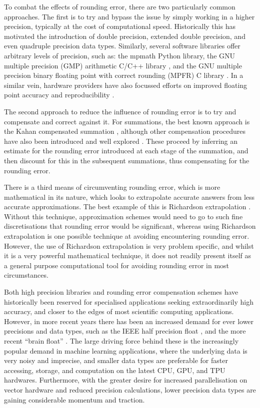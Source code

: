 \documentclass[manuscript,review]{acmart}
\begin{document}
To combat the effects of rounding error, there are two particularly common approaches. The first is to try and bypass the issue by simply working in a higher precision, typically at the cost of computational speed. Historically this has motivated the introduction of double precision, extended double precision, and even quadruple precision data types. Similarly, several software libraries offer arbitrary levels of precision, such as: the mpmath \citep{mpmath} Python library, the GNU
multiple precision (GMP) arithmetic C/C++ library \citep{granlund2012gmp}, and the GNU multiple precision binary floating point with correct rounding (MPFR) C library \citep{fousse2007MPFR}. In a similar vein, hardware providers have also focussed efforts on improved floating point accuracy and reproducibility  \citep{burgess2018high}.

The second approach to reduce the influence of rounding error is to try and compensate and correct against it. For summations, the best known approach is the Kahan compensated summation \citep{kahan1965further}, although other compensation procedures have also been introduced and well explored \citep{moller1965quasi,knuth2014art,dekker1971floating,neumaier1974rounding,babuska1968numerical,klein2006generalised,linz1970floating,ogita2005accurate}. These proceed by inferring an estimate for the rounding error introduced at each stage of the summation, and then discount for this in the subsequent summations, thus compensating for the rounding error. 

There is a third means of circumventing rounding error, which is more mathematical in its nature, which looks to extrapolate accurate answers from less accurate approximations. The best example of this is Richardson extrapolation \citep{richardson1927viii,marchuk2012difference}. Without this technique, approximation schemes would need to go to such fine discretisations that rounding error would be significant, whereas using Richardson extrapolation is one possible technique at avoiding encountering rounding error. However, the use of Richardson extrapolation is very problem specific, and whilst it is a very powerful mathematical technique, it does not readily present itself as a general purpose computational tool for avoiding rounding error in most circumstances.  

Both high precision libraries and rounding error compensation schemes have historically been reserved for specialised applications seeking extraordinarily high accuracy, and closer to the edges of most scientific computing applications. However, in more recent years there has been an increased demand for ever lower precisions and data types, such as the IEEE half precision float \citep{ieee2008ieee}, and the more recent ``brain float'' \citep{burgess2019bfloat16,kalamkar2019study}. The large driving force behind these is the increasingly popular demand in machine learning applications, where the underlying data is very noisy and imprecise, and smaller data types are preferable for faster accessing, storage, and computation on the latest CPU, GPU, and TPU hardwares. Furthermore, with the greater desire for increased parallelisation on vector hardware and reduced precision calculations, lower precision data types are gaining considerable momentum and traction. 
\end{document}
